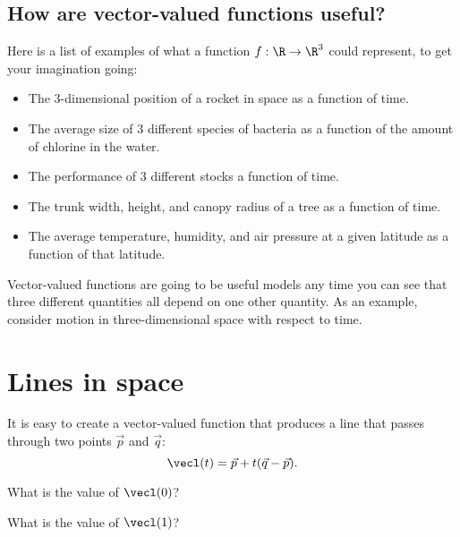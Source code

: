 \documentclass{ximera}
\begin{document}
\subsection{How are vector-valued functions useful?}

Here is a list of examples of what a
function $f: \R \to \R^3$ could represent, to get your imagination
going:

\begin{itemize}
\item The $3$-dimensional position of a rocket in space as a function of time. 
\item The average size of $3$ different species of bacteria as a function of the amount of chlorine in the water.
\item The performance of $3$ different stocks a function of time.
\item The trunk width, height, and canopy radius of a tree as a function of time.
\item The average temperature, humidity, and air pressure at a given latitude as a function of that latitude.
\end{itemize}

Vector-valued functions are going to be useful models any time you can
see that three different quantities all depend on one other quantity.
As an example, consider motion in three-dimensional space with respect
to time.

\section{Lines in space}

It is easy to create a vector-valued function that produces a line
that passes through two points $\vec{p}$ and $\vec{q}$:
\[
\vecl(t) = \vec{p} + t(\vec{q}-\vec{p}).
\]
\begin{question}
  What is the value of $\vecl(0)$?
  \begin{prompt}
  \begin{multipleChoice}
  \end{multipleChoice}
  \end{prompt}
  \begin{question}
    What is the value of $\vecl(1)$?
    \begin{prompt}
    \begin{multipleChoice}
    \end{multipleChoice}
    \end{prompt}
  \end{question}
\end{question}
\end{document}

